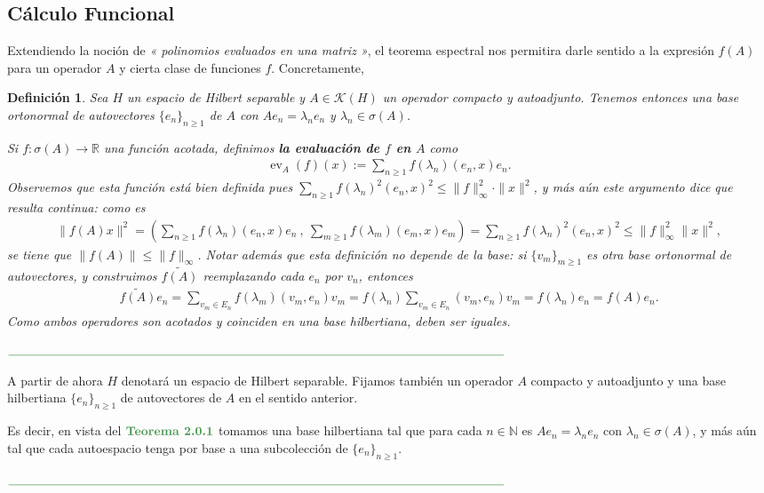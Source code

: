 \documentclass[11pt]{report}
\theoremstyle{colored}
\newtheorem{definition}{Definición}[section]
\newcommand{\N}{\mathbb{N}}
\newcommand{\R}{\mathbb{R}}
\newcommand{\ev}{\operatorname{ev}}
\newcommand{\ip}[1]{( #1 )}
\newcommand{\paint}[1]{\color{color}{#1}}
\newcommand{\tpaint}[1]{\paint{\textbf{#1}}}
\newcommand{\paintline}{\begin{center}
$\paint{
\rule{400pt}{0.5pt}
}$
\vspace{10pt}
\end{center}}
\begin{document}
\subsection{Cálculo Funcional}

Extendiendo la noción de \textit{« polinomios evaluados en una matriz »}, el teorema espectral nos permitira darle sentido a la expresión $f(A)$ para un operador $A$ y cierta clase de funciones $f$. Concretamente, 

\begin{definition} Sea $H$ un espacio de Hilbert separable y $A \in \mathscr{K}(H)$ un operador compacto y autoadjunto. Tenemos entonces una base ortonormal de autovectores $\{e_n\}_{n \geq 1}$ de $A$ con $Ae_n = \lambda_ne_n$ y $\lambda_n \in \sigma(A)$. 

Si $f : \sigma(A) \to \R$ una función acotada, definimos \textbf{la evaluación de $f$ en $A$} como
\begin{align*}
\ev_A(f)(x) := \sum_{n \geq 1}f(\lambda_n)\ip{e_n,x}e_n.
\end{align*}
Observemos que esta función está bien definida pues $\sum_{n \geq 1}f(\lambda_n)^2\ip{e_n,x}^2 \leq \|f\|^2_\infty \cdot \|x\|^2$, y más aún este argumento dice que resulta continua: como es
\begin{align*}
\|f(A)x\|^2 = \left\ip{\sum_{n \geq 1}f(\lambda_n)\ip{e_n,x}e_n \ , \ \sum_{m \geq 1}f(\lambda_m)\ip{e_m,x}e_m\right} = \sum_{n \geq 1}f(\lambda_n)^2\ip{e_n,x}^2 \leq \|f\|^2_\infty\|x\|^2,
\end{align*}
se tiene que $\|f(A)\| \leq \|f\|_\infty$. Notar además que esta definición no depende de la base: si $\{v_m\}_{m \geq 1}$ es otra base ortonormal de autovectores, y construimos $\widetilde{f(A)}$ reemplazando cada $e_n$ por $v_n$, entonces
\begin{align*}
\widetilde{f(A)}e_n = \sum_{v_m \in E_n}f(\lambda_m)(v_m,e_n)v_m = f(\lambda_n)\sum_{v_m \in E_n}(v_m,e_n)v_m = f(\lambda_n)e_n = f(A)e_n.
\end{align*}
Como ambos operadores son acotados y coinciden en una base hilbertiana, deben ser iguales.
\end{definition}

\paintline
A partir de ahora $H$ denotará un espacio de Hilbert separable. Fijamos también un operador $A$ compacto y autoadjunto y una base hilbertiana $\{e_n\}_{n \geq 1}$ de autovectores de $A$ en el sentido anterior.

Es decir, en vista del $\tpaint{Teorema 2.0.1}$ tomamos una base hilbertiana tal que para cada $n \in \N$ es $Ae_n = \lambda_ne_n$ con $\lambda_n \in \sigma(A)$, y más aún tal que cada autoespacio tenga por base a una subcolección de $\{e_n\}_{n \geq 1}$.
\paintline
\end{document}
